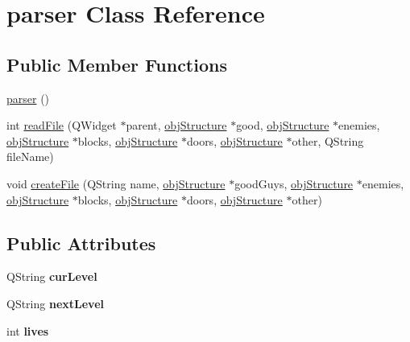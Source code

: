 \hypertarget{classparser}{\section{parser Class Reference}
\label{classparser}
}
\subsection*{Public Member Functions}
\begin{DoxyCompactItemize}
\item 
\hyperlink{classparser_ac4cb16e924a735dfb5837772afa1a1a9}{parser} ()
\item 
int \hyperlink{classparser_aa16938ad5757d700376a6fadb4e11e2a}{read\-File} (Q\-Widget $\ast$parent, \hyperlink{classobj_structure}{obj\-Structure} $\ast$good, \hyperlink{classobj_structure}{obj\-Structure} $\ast$enemies, \hyperlink{classobj_structure}{obj\-Structure} $\ast$blocks, \hyperlink{classobj_structure}{obj\-Structure} $\ast$doors, \hyperlink{classobj_structure}{obj\-Structure} $\ast$other, Q\-String file\-Name)
\item 
void \hyperlink{classparser_ace9c694c314e8314bcee42ca751f64a0}{create\-File} (Q\-String name, \hyperlink{classobj_structure}{obj\-Structure} $\ast$good\-Guys, \hyperlink{classobj_structure}{obj\-Structure} $\ast$enemies, \hyperlink{classobj_structure}{obj\-Structure} $\ast$blocks, \hyperlink{classobj_structure}{obj\-Structure} $\ast$doors, \hyperlink{classobj_structure}{obj\-Structure} $\ast$other)
\end{DoxyCompactItemize}
\subsection*{Public Attributes}
\begin{DoxyCompactItemize}
\item 
\hypertarget{classparser_a60fba17300bd869e168287358a620fc2}{Q\-String {\bfseries cur\-Level}}\label{classparser_a60fba17300bd869e168287358a620fc2}

\item 
\hypertarget{classparser_aded4d171590ab8bc5ff16d28349e72c5}{Q\-String {\bfseries next\-Level}}\label{classparser_aded4d171590ab8bc5ff16d28349e72c5}

\item 
\hypertarget{classparser_a700ed3fe73034eb63ed69dd40f3de7b1}{int {\bfseries lives}}\label{classparser_a700ed3fe73034eb63ed69dd40f3de7b1}

\end{DoxyCompactItemize}


